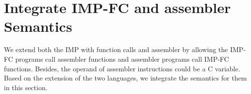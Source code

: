 \documentclass[letterpaper, 10 pt, conference]{IEEEtran}
\begin{document}
%

\section{Integrate IMP-FC and assembler Semantics}
\par We extend both the IMP with function calls and assembler by allowing the IMP-FC programs call assembler functions and assembler programs call IMP-FC functions. Besides, the operand of assembler instructions could be a C variable. Based on the extension of the two languages, we integrate the semantics for them in this section.
\end{document}
